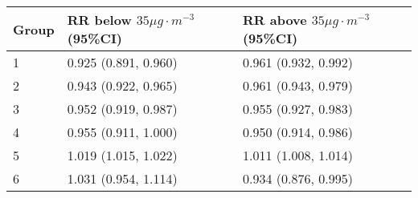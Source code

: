 \begin{tabular}{lll}
  \hline
Group & RR below $35 \mu g \cdot m^{-3}$ (95\%CI) & RR above $35 \mu g \cdot m^{-3}$ (95\%CI) \\ 
  \hline
   1 & 0.925 (0.891, 0.960) & 0.961 (0.932, 0.992) \\ 
     2 & 0.943 (0.922, 0.965) & 0.961 (0.943, 0.979) \\ 
     3 & 0.952 (0.919, 0.987) & 0.955 (0.927, 0.983) \\ 
     4 & 0.955 (0.911, 1.000) & 0.950 (0.914, 0.986) \\ 
     5 & 1.019 (1.015, 1.022) & 1.011 (1.008, 1.014) \\ 
     6 & 1.031 (0.954, 1.114) & 0.934 (0.876, 0.995) \\ 
   \hline
\end{tabular}

